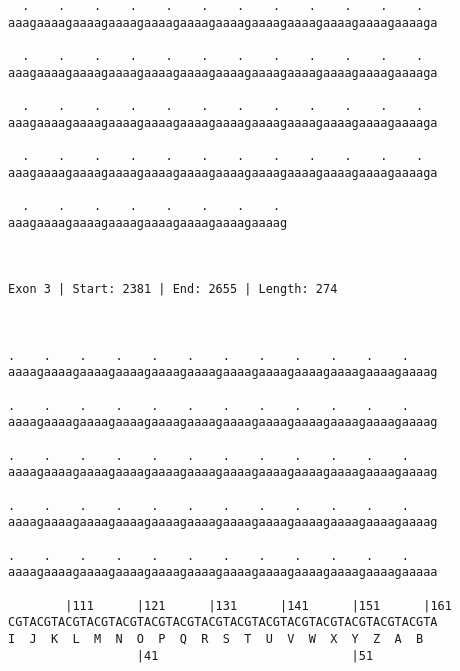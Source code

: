 \documentclass{article}
\begin{document}
\begin{Verbatim}
  .    .    .    .    .    .    .    .    .    .    .    .  
aaagaaaagaaaagaaaagaaaagaaaagaaaagaaaagaaaagaaaagaaaagaaaaga
                                                            
  .    .    .    .    .    .    .    .    .    .    .    .  
aaagaaaagaaaagaaaagaaaagaaaagaaaagaaaagaaaagaaaagaaaagaaaaga
                                                            
  .    .    .    .    .    .    .    .    .    .    .    .  
aaagaaaagaaaagaaaagaaaagaaaagaaaagaaaagaaaagaaaagaaaagaaaaga
                                                            
  .    .    .    .    .    .    .    .    .    .    .    .  
aaagaaaagaaaagaaaagaaaagaaaagaaaagaaaagaaaagaaaagaaaagaaaaga
                                                            
  .    .    .    .    .    .    .    . 
aaagaaaagaaaagaaaagaaaagaaaagaaaagaaaag
                                       
                                       
 
Exon 3 | Start: 2381 | End: 2655 | Length: 274



.    .    .    .    .    .    .    .    .    .    .    .    
aaaagaaaagaaaagaaaagaaaagaaaagaaaagaaaagaaaagaaaagaaaagaaaag
                                                            
.    .    .    .    .    .    .    .    .    .    .    .    
aaaagaaaagaaaagaaaagaaaagaaaagaaaagaaaagaaaagaaaagaaaagaaaag
                                                            
.    .    .    .    .    .    .    .    .    .    .    .    
aaaagaaaagaaaagaaaagaaaagaaaagaaaagaaaagaaaagaaaagaaaagaaaag
                                                            
.    .    .    .    .    .    .    .    .    .    .    .    
aaaagaaaagaaaagaaaagaaaagaaaagaaaagaaaagaaaagaaaagaaaagaaaag
                                                            
.    .    .    .    .    .    .    .    .    .    .    .    
aaaagaaaagaaaagaaaagaaaagaaaagaaaagaaaagaaaagaaaagaaaagaaaaa
                                                            
        |111      |121      |131      |141      |151      |161
CGTACGTACGTACGTACGTACGTACGTACGTACGTACGTACGTACGTACGTACGTACGTA
I  J  K  L  M  N  O  P  Q  R  S  T  U  V  W  X  Y  Z  A  B  
                  |41                           |51         
  

\end{Verbatim}
\end{document}
